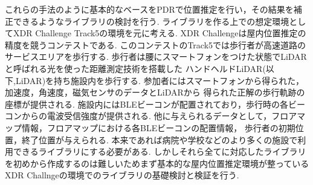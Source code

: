 これらの手法のように基本的なベースをPDRで位置推定を行い，その結果を補正できるようなライブラリの検討を行う.
ライブラリを作る上での想定環境としてXDR Challenge Track5の環境を元に考える.
XDR Challengeは屋内位置推定の精度を競うコンテストである.
このコンテストのTrack5では歩行者が高速道路のサービスエリアを歩行する.
歩行者は腰にスマートフォンをつけた状態でLiDARと呼ばれる光を使った距離測定技術を搭載した
ハンドヘルドLiDAR(以下,LiDAR)を持ち施設内を歩行する.
参加者にはスマートフォンから得られた，加速度，角速度，磁気センサのデータとLiDARから
得られた正解の歩行軌跡の座標が提供される.
施設内にはBLEビーコンが配置されており，歩行時の各ビーコンからの電波受信強度が提供される.
他に与えられるデータとして，フロアマップ情報，フロアマップにおける各BLEビーコンの配置情報，
歩行者の初期位置，終了位置が与えられる.
本来であれば病院や学校などのより多くの施設で利用できるライブラリにする必要がある.
しかしそれら全てに対応したライブラリを初めから作成するのは難しいためまず基本的な屋内位置推定環境が整っている
XDR Challngeの環境でのライブラリの基礎検討と検証を行う.
